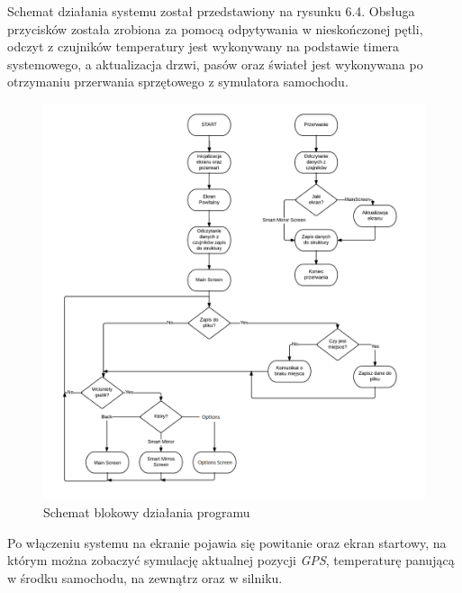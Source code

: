 \documentclass{xmgr}
\begin{document}
Schemat działania systemu został przedstawiony na rysunku 6.4. Obsługa przycisków została zrobiona za pomocą odpytywania w nieskończonej pętli, odczyt z czujników temperatury jest wykonywany na podstawie timera systemowego, a aktualizacja drzwi, pasów oraz świateł jest wykonywana po otrzymaniu przerwania sprzętowego z symulatora samochodu.

\begin{figure}[!hp]
    \centering
    	\includegraphics[height=0.58\textheight]{images/codeDiagram.png}
    \caption{Schemat blokowy działania programu}
\end{figure}

Po włączeniu systemu na ekranie pojawia się powitanie oraz ekran startowy, na którym można zobaczyć symulację aktualnej pozycji \emph{GPS}, temperaturę panującą w środku samochodu, na zewnątrz oraz w silniku. 
\end{document}
